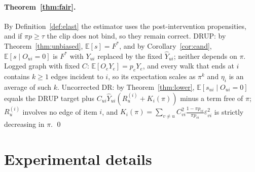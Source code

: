 \documentclass[preprint,review,12pt,authoryear]{elsarticle}
\theoremstyle{definition}
\newcommand{\E}{\mathbb{E}}
\begin{document}
\paragraph{Theorem~\ref{thm:fair}.}
By Definition~\ref{def:elast} the estimator uses the post-intervention
propensities, and if $\pi p\ge\tau$ the clip does not bind, so they remain
correct. DRUP: by Theorem~\ref{thm:unbiased}, $\E[s]=F^*$,
and by Corollary~\ref{cor:cand}, $\E[s\mid O_{ui}=0]$ is $F^*$ with $Y_{ui}$ replaced by
the fixed $\hat Y_{ui}$; neither depends on $\pi$. Logged graph with fixed $C$: $\E[O_eY_e]=p_eY_e$,
and every walk that ends at $i$ contains $k\ge1$ edges incident to $i$, so its
expectation scales as $\pi^k$ and $\eta_i$ is an average of such $k$. Uncorrected
DR: by Theorem~\ref{thm:lower}, $\E[s_{ui}\mid O_{ui}=0]$ equals the DRUP target plus
$C_{ui}\hat Y_{ui}(R_u^{(i)}+K_i(\pi))$ minus a term free of $\pi$; $R_u^{(i)}$ involves
no edge of item $i$, and $K_i(\pi)=\sum_{v\ne u}C_{vi}^2\frac{1-\pi p_{vi}}{\pi p_{vi}}\varepsilon_{vi}^2$ is
strictly decreasing in $\pi$. \qed

\section{Experimental details}\label{app:details}
\end{document}

